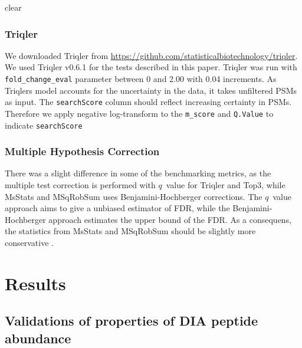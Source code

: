 \documentclass[10pt,letterpaper]{article}
\begin{document}


clear
\subsubsection*{Triqler}

We downloaded Triqler from \url{https://github.com/statisticalbiotechnology/triqler}. We used Triqler v0.6.1 for the tests described in this paper. Triqler was run with \texttt{fold\_change\_eval} parameter between 0 and 2.00 with 0.04 increments. As Triqlers model accounts for the uncertainty in the data, it takes unfiltered PSMs as input. The \texttt{searchScore} column should reflect increasing certainty in PSMs. Therefore we apply negative log-transform to the \texttt{m\_score} and \texttt{Q.Value} to indicate \texttt{searchScore} 

\subsubsection*{Multiple Hypothesis Correction}
There was a slight difference in some of the benchmarking metrics, as the multiple test correction is performed with $q$~value for Triqler and Top3, while MsStats and MSqRobSum uses Benjamini-Hochberger \cite{benjamini1995controlling} corrections. The $q$~value approach aims to give a unbiased estimator of FDR, while the Benjamini-Hochberger approach estimates the upper bound of the FDR. As a consequens, the statistics from MsStats and MSqRobSum should be slightly more conservative \cite{korthauer2019practical}.



\section*{Results}



\subsection*{Validations of properties of DIA peptide abundance}
\end{document}
